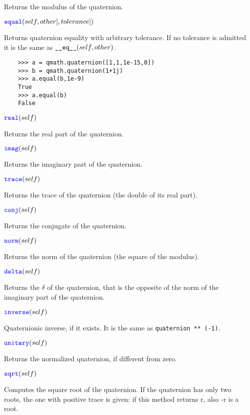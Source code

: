 \documentclass[11pt]{paper}
\begin{document}
Returns the modulus of the quaternion.

\medskip
\noindent $\textcolor{blue}{\texttt{\mbox{equal}}}(self,other[,tolerance])$ 

Returns quaternion equality with arbitrary tolerance. If no tolerance is admitted it is the same as $\texttt{\_\_\mbox{eq}\_\_}(self,other)$.
\begin{verbatim}
    >>> a = qmath.quaternion([1,1,1e-15,0])
    >>> b = qmath.quaternion(1+1j)
    >>> a.equal(b,1e-9)
    True
    >>> a.equal(b)
    False
\end{verbatim}

\medskip
\noindent $\textcolor{blue}{\texttt{\mbox{real}}}(self)$ 

Returns the real part of the quaternion.

\medskip
\noindent $\textcolor{blue}{\texttt{\mbox{imag}}}(self)$ 

Returns the imaginary part of the quaternion.

\medskip
\noindent $\textcolor{blue}{\texttt{\mbox{trace}}}(self)$ 

Returns the trace of the quaternion (the double of its real part).

\medskip
\noindent $\textcolor{blue}{\texttt{\mbox{conj}}}(self)$ 

Returns the conjugate of the quaternion.

\medskip
\noindent $\textcolor{blue}{\texttt{\mbox{norm}}}(self)$ 

Returns the norm of the quaternion (the square of the modulus).

\medskip
\noindent $\textcolor{blue}{\texttt{\mbox{delta}}}(self)$ 

Returns the $\delta$ of the quaternion, that is the opposite of the norm of the imaginary part of the quaternion.

\medskip
\noindent $\textcolor{blue}{\texttt{\mbox{inverse}}}(self)$ 

Quaternionic inverse, if it exists. It is the same as \texttt{quaternion ** (-1)}.

\medskip
\noindent $\textcolor{blue}{\texttt{\mbox{unitary}}}(self)$ 

Returns the normalized quaternion, if different from zero.

\medskip
\noindent $\textcolor{blue}{\texttt{\mbox{sqrt}}}(self)$ 

Computes the square root of the quaternion. If the quaternion has only two roots, the one with positive trace is given: if this method returns r, also -r is a root.
\end{document}
